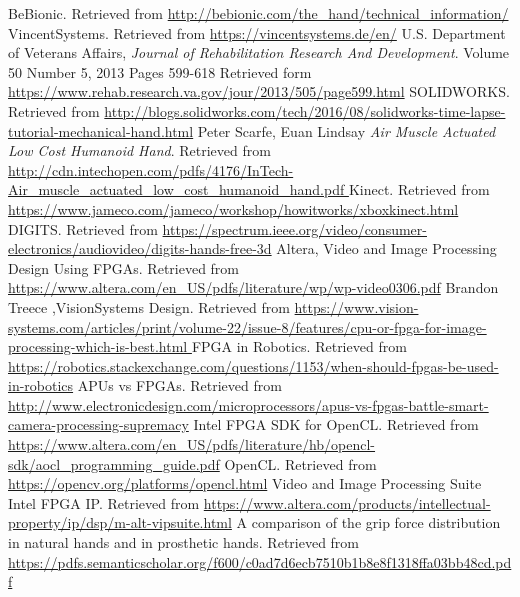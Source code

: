 \documentclass{article}
\begin{document}
\break
\begin{thebibliography}{1}
	 BeBionic. Retrieved from {\url{http://bebionic.com/the_hand/technical_information/}} 
	 VincentSystems. Retrieved from {\url{  https://vincentsystems.de/en/}} 
	 U.S. Department of Veterans Affairs, {\em Journal of Rehabilitation Research And Development}. Volume 50 Number 5, 2013
   Pages 599-618 Retrieved form {\url{https://www.rehab.research.va.gov/jour/2013/505/page599.html}}
	 SOLIDWORKS. Retrieved from {\url{ http://blogs.solidworks.com/tech/2016/08/solidworks-time-lapse-tutorial-mechanical-hand.html}}
	 Peter Scarfe, Euan Lindsay {\em Air Muscle Actuated Low Cost Humanoid Hand}. Retrieved from {\url{ http://cdn.intechopen.com/pdfs/4176/InTech-Air_muscle_actuated_low_cost_humanoid_hand.pdf
}} 
	 Kinect. Retrieved from {\url{https://www.jameco.com/jameco/workshop/howitworks/xboxkinect.html}}
	 DIGITS. Retrieved from {\url{https://spectrum.ieee.org/video/consumer-electronics/audiovideo/digits-hands-free-3d}}	
	 Altera, Video and Image Processing Design Using FPGAs. Retrieved from {\url{https://www.altera.com/en_US/pdfs/literature/wp/wp-video0306.pdf}}
	 Brandon Treece ,VisionSystems Design. Retrieved from {\url{https://www.vision-systems.com/articles/print/volume-22/issue-8/features/cpu-or-fpga-for-image-processing-which-is-best.html	}}
	 FPGA in Robotics. Retrieved from {\url{https://robotics.stackexchange.com/questions/1153/when-should-fpgas-be-used-in-robotics}}
	 APUs vs FPGAs. Retrieved from {\url{http://www.electronicdesign.com/microprocessors/apus-vs-fpgas-battle-smart-camera-processing-supremacy}}
	 Intel FPGA SDK for OpenCL. Retrieved from {\url{https://www.altera.com/en_US/pdfs/literature/hb/opencl-sdk/aocl_programming_guide.pdf}}
	 OpenCL. Retrieved from {\url{https://opencv.org/platforms/opencl.html}}
	 Video and Image Processing Suite Intel FPGA IP. Retrieved from {\url{https://www.altera.com/products/intellectual-property/ip/dsp/m-alt-vipsuite.html}}
	 A comparison of the grip force distribution in natural hands and in prosthetic hands. Retrieved from {\url{https://pdfs.semanticscholar.org/f600/c0ad7d6ecb7510b1b8e8f1318ffa03bb48cd.pdf}}



\end{thebibliography}
  
\end{document}
